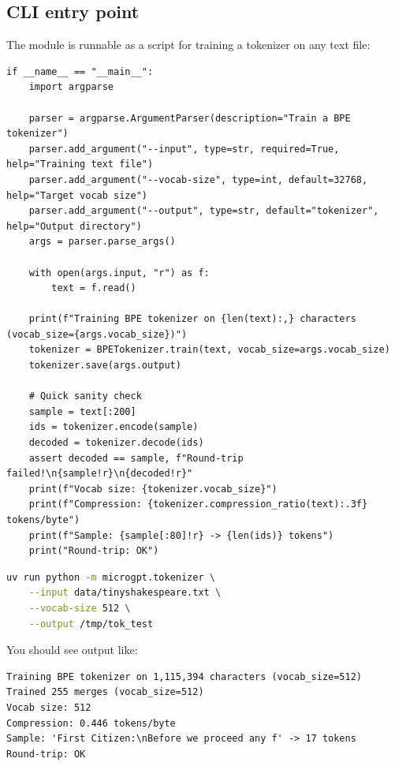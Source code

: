 \subsection{CLI entry point}

The module is runnable as a script for training a tokenizer on any text file:

\begin{lstlisting}
if __name__ == "__main__":
    import argparse

    parser = argparse.ArgumentParser(description="Train a BPE tokenizer")
    parser.add_argument("--input", type=str, required=True, help="Training text file")
    parser.add_argument("--vocab-size", type=int, default=32768, help="Target vocab size")
    parser.add_argument("--output", type=str, default="tokenizer", help="Output directory")
    args = parser.parse_args()

    with open(args.input, "r") as f:
        text = f.read()

    print(f"Training BPE tokenizer on {len(text):,} characters (vocab_size={args.vocab_size})")
    tokenizer = BPETokenizer.train(text, vocab_size=args.vocab_size)
    tokenizer.save(args.output)

    # Quick sanity check
    sample = text[:200]
    ids = tokenizer.encode(sample)
    decoded = tokenizer.decode(ids)
    assert decoded == sample, f"Round-trip failed!\n{sample!r}\n{decoded!r}"
    print(f"Vocab size: {tokenizer.vocab_size}")
    print(f"Compression: {tokenizer.compression_ratio(text):.3f} tokens/byte")
    print(f"Sample: {sample[:80]!r} -> {len(ids)} tokens")
    print("Round-trip: OK")
\end{lstlisting}


\shelltag
\begin{lstlisting}[language=bash]
uv run python -m microgpt.tokenizer \
    --input data/tinyshakespeare.txt \
    --vocab-size 512 \
    --output /tmp/tok_test
\end{lstlisting}

You should see output like:
\outputtag
\begin{lstlisting}[language={}]
Training BPE tokenizer on 1,115,394 characters (vocab_size=512)
Trained 255 merges (vocab_size=512)
Vocab size: 512
Compression: 0.446 tokens/byte
Sample: 'First Citizen:\nBefore we proceed any f' -> 17 tokens
Round-trip: OK
\end{lstlisting}

